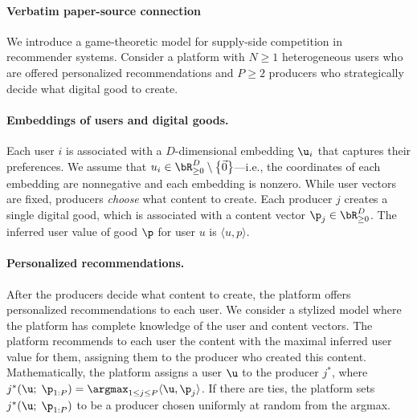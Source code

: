 \documentclass[10pt]{article}
\begin{document}
\paragraph{Verbatim paper-source connection}
\begin{ReviewVerbatim}
We introduce a game-theoretic model for supply-side competition in recommender systems. Consider a platform with $N \ge 1$ heterogeneous users who are offered personalized recommendations and $P \ge 2$ producers who strategically decide what digital good to create.


\paragraph{Embeddings of users and digital goods.}
Each user $i$ is associated with a $D$-dimensional embedding $\u_i$ that captures their preferences. We assume that $u_i \in \bR_{\geq 0}^D \setminus \left\{\vec{0} \right\}$---i.e., the coordinates of each embedding are nonnegative and each embedding is nonzero. While user vectors are fixed, producers \textit{choose} what content to create. Each producer $j$ creates a single digital good, which is associated with a content vector $\p_j \in \bR_{\geq 0}^D$. The inferred user value of good $\p$ for user $u$ is $\langle u, p \rangle$.

\paragraph{Personalized recommendations.}
After the producers decide what content to create, the platform offers personalized recommendations to each user. We consider a stylized model where the platform has complete knowledge of the user and content vectors. The platform recommends to each user the content with the maximal inferred user value for them, assigning them to the producer who created this content. Mathematically, the platform assigns a user $\u$ to the producer $j^*$, where $j^*(\u;\;\p_{1:P}) = \argmax_{1 \le j \le P} \langle \u, \p_j\rangle$. If there are ties, the platform sets $j^*(\u;\;\p_{1:P})$ to be a producer chosen uniformly at random from the argmax.


\end{ReviewVerbatim}
\end{document}
